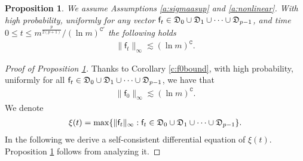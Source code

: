 \documentclass{article}
\numberwithin{equation}{section}
\newcommand{\fC}{{\mathtt C}}
\newcommand{\fD}{{\frak D}}
\newcommand{\sff}{{\mathsf f}}
\renewcommand{\leq}{\leqslant}
\newcommand{\1}{\mathds{1}}
\theoremstyle{plain} %
\newtheorem{proposition}[theorem]{Proposition}
\begin{document}
\begin{proposition}\label{p:ftbound}
We assume Assumptions \ref{a:sigmaasup} and \ref{a:nonlinear}. With high probability, uniformly for any vector $\sff_t\in \fD_0\cup\fD_1\cup
\cdots\cup \fD_{p-1}$, and time $0\leq t\leq m^{\frac{p}{2(p+1)}}/(\ln m)^{\fC'}$ the following holds
\begin{align*}
\|\sff_t\|_\infty\lesssim (\ln m)^\fC.
\end{align*}
\end{proposition}

\begin{proof}[Proof of Proposition \ref{p:ftbound}]
Thanks to Corollary \ref{c:f0bound}, with high probability, uniformly for all $\sff_t\in \fD_0\cup\fD_1\cup\cdots\cup \fD_{p-1}$, we have that 
\begin{align*}
\|\sff_0\|_{\infty}\lesssim (\ln m)^{\fC}.
\end{align*}
We denote 
\begin{align}\label{e:defxi2}
\xi(t)=\max\{\|\sff_t\|_\infty: \sff_t\in \fD_0\cup\fD_1\cup\cdots\cup \fD_{p-1}\}.
\end{align}
In the following we derive a self-consistent differential equation of $\xi(t)$. Proposition \ref{p:ftbound} follows from analyzing it.


\end{proof}
\end{document}
